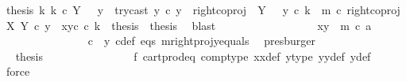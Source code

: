 \begin{isabellebody}
\ {\isacartoucheopen}{\isasymAnd}thesis{\isachardot}{\kern0pt}\ {\isacharparenleft}{\kern0pt}{\isasymAnd}k{\isachardot}{\kern0pt}\ k\ {\isasymin}\isactrlsub c\ Y\ {\isasymsetminus}\ {\isacharparenleft}{\kern0pt}{\isasymone}{\isacharcomma}{\kern0pt}\ y{}{\isacharparenright}{\kern0pt}\ {\isasymand}\ try{\isacharunderscore}{\kern0pt}cast\ y{}\ {\isasymcirc}\isactrlsub c\ y\ {\isacharequal}{\kern0pt}\ right{\isacharunderscore}{\kern0pt}coproj\ {\isasymone}\ {\isacharparenleft}{\kern0pt}Y\ {\isasymsetminus}\ {\isacharparenleft}{\kern0pt}{\isasymone}{\isacharcomma}{\kern0pt}\ y{}{\isacharparenright}{\kern0pt}{\isacharparenright}{\kern0pt}\ {\isasymcirc}\isactrlsub c\ k\ {\isasymand}\ m\ {\isasymcirc}\isactrlsub c\ right{\isacharunderscore}{\kern0pt}coproj\ X\ Y\ {\isasymcirc}\isactrlsub c\ y\ {\isacharequal}{\kern0pt}\ {\isasymlangle}x{}{\isacharcomma}{\kern0pt}y{}\isactrlsup c\ {\isasymcirc}\isactrlsub c\ k{\isasymrangle}\ {\isasymLongrightarrow}\ thesis{\isacharparenright}{\kern0pt}\ {\isasymLongrightarrow}\ thesis{\isacartoucheclose}\ \isamarkupfalse%
\ blast\isanewline
\ \ \ \ \ \ \ \ \ \ \ \ \ \ \ \ \isamarkupfalse%
\ {\isachardoublequoteopen}{\isasymlangle}x{}{\isacharcomma}{\kern0pt}y{}{\isasymrangle}\ {\isacharequal}{\kern0pt}\ m\ {\isasymcirc}\isactrlsub c\ a{\isachardoublequoteclose}\isanewline
\ \ \ \ \ \ \ \ \ \ \ \ \ \ \isamarkupfalse%
\ {\isacartoucheopen}c\ {\isacharequal}{\kern0pt}\ y{}{\isacartoucheclose}\ c{\isacharunderscore}{\kern0pt}def\ eqs\ m{\isacharunderscore}{\kern0pt}rightproj{\isacharunderscore}{\kern0pt}y{}{\isacharunderscore}{\kern0pt}equals\ \isamarkupfalse%
\ presburger\isanewline
\ \ \ \ \ \ \ \ \ \ \ \ \ \ \isamarkupfalse%
\ \isamarkupfalse%
\ {\isacharquery}{\kern0pt}thesis\isanewline
\ \ \ \ \ \ \ \ \ \ \ \ \ \ \isamarkupfalse%
\ f{}\ cart{\isacharunderscore}{\kern0pt}prod{\isacharunderscore}{\kern0pt}eq{}\ comp{\isacharunderscore}{\kern0pt}type\ x{}x{}{\isacharunderscore}{\kern0pt}def\ y{}{\isacharprime}{\kern0pt}{\isacharunderscore}{\kern0pt}type\ y{}y{}{\isacharunderscore}{\kern0pt}def{\isacharparenleft}{\kern0pt}{}{\isacharparenright}{\kern0pt}\ y{\isacharunderscore}{\kern0pt}def\ \isamarkupfalse%
\ force\isanewline
\ \ \ \ \ \ \ \ \ \ \ \ \ \ \isamarkupfalse%
\isanewline
\ \ \ \ \ \ \ \ \ \ \isamarkupfalse%

\end{isabellebody}
